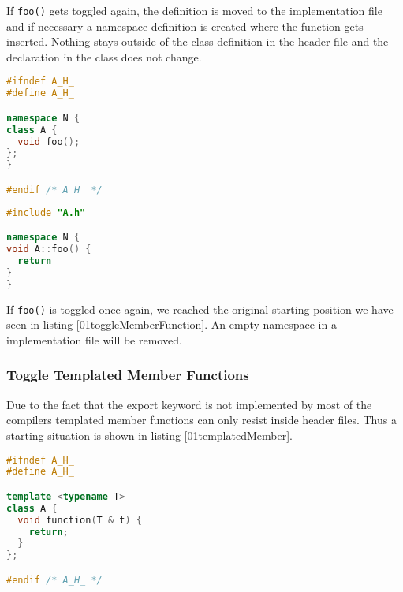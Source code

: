 If \texttt{foo()} gets toggled again, the definition is moved to the
implementation file and if necessary a namespace definition is created where
the function gets inserted. Nothing stays outside of the class definition in the
header file and the declaration in the class does not change.

\vspace{0.5cm}
\begin{minipage}{.48\textwidth}
\lstset{xrightmargin=0.5cm}
\begin{lstlisting}[caption={A.h, after moved definition},
label={03toggleMemberFunction}, language=C++]
#ifndef A_H_
#define A_H_

namespace N {
class A {
  void foo();
};
}

#endif /* A_H_ */
\end{lstlisting}
\end{minipage}%
\begin{minipage}{.48\textwidth}
\lstset{xleftmargin=0.5cm}
\begin{lstlisting}[caption={A.cpp with definition},
label={03_1toggleMemberFunction}, language=C++ ]
#include "A.h"

namespace N {
void A::foo() {
  return
}
}
\end{lstlisting}
\end{minipage}

If \texttt{foo()} is toggled once again, we reached the original starting
position we have seen in listing \ref{01toggleMemberFunction}. An empty
namespace in a implementation file will be removed.

\subsubsection{Toggle Templated Member Functions}

Due to the fact that the export keyword is not implemented by most of the
compilers templated member functions can only resist inside header files. Thus
a starting situation is shown in listing \ref{01templatedMember}.

\begin{lstlisting}[caption={A.h, in class definition with template parameters},
label={01templatedMember}, language=C++]
#ifndef A_H_
#define A_H_

template <typename T>
class A {
  void function(T & t) {
    return;
  }
};

#endif /* A_H_ */
\end{lstlisting}

